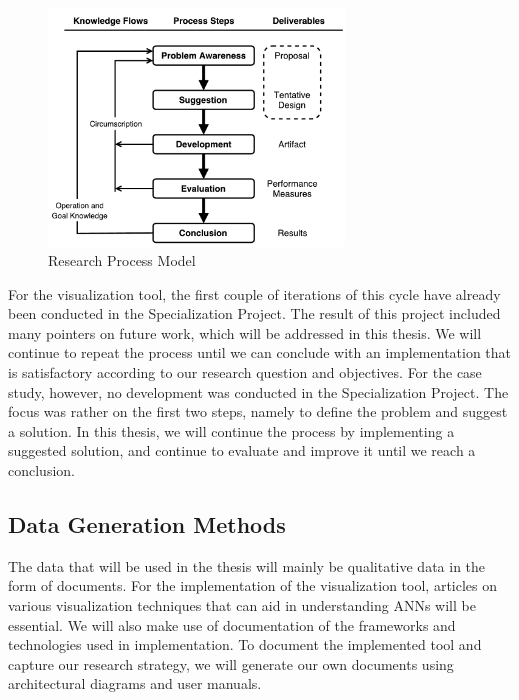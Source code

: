 \begin{figure}[h!]
    \centering
        \includegraphics[width=0.7\textwidth]{fig/dsr-cycle.pdf}
        \caption{Research Process Model}
        \label{dsr-cycle}
\end{figure}

\noindent For the visualization tool, the first couple of iterations of this cycle have already been conducted in the Specialization Project. The result of this project included many pointers on future work, which will be addressed in this thesis. We will continue to repeat the process until we can conclude with an implementation that is satisfactory according to our research question and objectives. For the case study, however, no development was conducted in the Specialization Project. The focus was rather on the first two steps, namely to define the problem and suggest a solution. In this thesis, we will continue the process by implementing a suggested solution, and continue to evaluate and improve it until we reach a conclusion.\\

\subsection{Data Generation Methods}

The data that will be used in the thesis will mainly be qualitative data in the form of documents. For the implementation of the visualization tool, articles on various visualization techniques that can aid in understanding ANNs will be essential. We will also make use of documentation of the frameworks and technologies used in implementation. To document the implemented tool and capture our research strategy, we will generate our own documents using architectural diagrams and user manuals. \\

